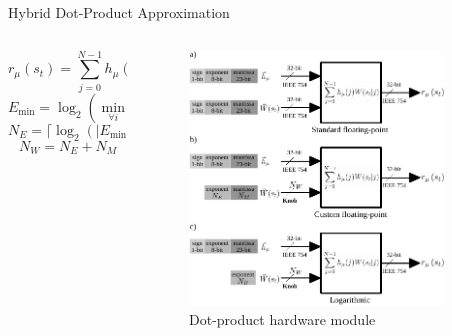 \begin{frame}{Hybrid Dot-Product Approximation}
	\begin{columns}[t] %
		\begin{column}{0.5\textwidth}
			
			\begin{equation}
			r_{\mu}\left(s_t\right)=\sum_{j=0}^{N-1}h_{\mu}(j)W(s_t|j)
			\end{equation}
			\vspace{4mm} 
			\begin{equation}
			E_{\min}=\log _2(\min_{\forall i}(W(i)))
			\end{equation}
			\vspace{4mm} 
			\begin{equation}
			N_E=\lceil\log_2(|E_{\min}|)\rceil
			\end{equation}
			\vspace{4mm} 
			\begin{equation}
			N_W=N_E + N_M
			\end{equation}
		\end{column}
		
		\begin{column}{0.5\textwidth}
			\begin{figure}
				\centering
				\includegraphics[width=0.9\textwidth]{../chapters/sbs_accelerator/figures/dot-product_unit.pdf} %
				\caption{Dot-product hardware module}
			\end{figure}
		\end{column}
	\end{columns}
\end{frame}

